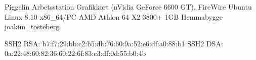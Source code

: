 \documentclass[a5paper]{article}
\begin{document}
   \computerdescription
       {Piggelin}
       {Arbetsstation}
       {Grafikkort (nVidia GeForce 6600 GT), FireWire}
       {Ubuntu Linux 8.10}
       {x86\_64/PC}
       {AMD Athlon 64 X2 3800+}
       {1GB}
       {Hemmabygge}
       {joakim\_tosteberg}



   \sshfingerprintheading
   \begin{sshfingerprint}
SSH2 RSA: b7:f7:29:bb:c2:b5:db:76:60:9a:52:e6:df:a0:88:b1
SSH2 DSA: 0a:22:48:60:82:36:60:22:6f:83:c3:df:0d:55:b0:4b
   \end{sshfingerprint}
\end{document}

